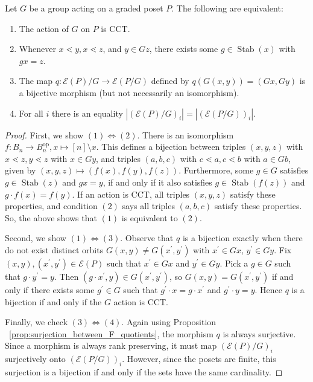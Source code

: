 \documentclass[smallextended]{svjour3}       %
\numberwithin{equation}{section}
\renewcommand{\iff}{\Leftrightarrow}
\newcommand\Stab{\operatorname{Stab}}
\newcommand\op{\operatorname{op}}
\begin{document}
\begin{lemma}
\label{lem:cover_transitive_equivalence}
Let $G$ be a group acting on a graded poset $P$. The following are equivalent:
\begin{enumerate}
  \item The action of $G$ on $P$ is CCT.
  \item Whenever $x \lessdot y,x \lessdot z$, and $y \in Gz$, there exists some $g \in \Stab(x)$ with $gx = z$.
  \item The map $q\colon \mathcal E(P)/G\rightarrow \mathcal E(P/G)$ defined by $q(G(x, y)) = (Gx,Gy)$ is a bijective morphism (but not necessarily an isomorphism).
  \item For all $i$ there is an equality $|(\mathcal E(P)/G)_i|=| (\mathcal E(P/G))_i|$.
\end{enumerate}
\end{lemma}
\begin{proof}
First, we show $(1) \iff (2)$. There is an isomorphism $f\colon B_n \rightarrow B_n^{\op},x \mapsto [n]\setminus x$. This defines a bijection between triples $(x,y,z)$ with $x \lessdot z,y \lessdot z$ with $x \in Gy$, and triples $(a,b,c)$ with $c \lessdot a, c \lessdot b$ with $a \in Gb$, given by $(x,y,z)\mapsto (f(x),f(y),f(z))$. Furthermore, some $g \in G$ satisfies $g \in \Stab(z)$ and $gx = y$, if and only if it also satisfies $g \in \Stab(f(z))$ and $g\cdot f(x) = f(y)$. If an action is CCT, all triples $(x,y,z)$ satisfy these properties, and condition $(2)$ says all triples $(a,b,c)$ satisfy these properties. So, the above shows that $(1)$ is equivalent to $(2)$.

Second, we show $(1) \iff (3)$. Observe that $q$ is a bijection exactly when there do not exist distinct orbits $G(x, y) \ne G(x^\prime, y^\prime)$ with $x^\prime\in Gx$, $y^\prime\in Gy$.  Fix $(x, y), (x^\prime, y^\prime)\in \mathcal E(P)$ such that $x^\prime\in Gx$ and $y^\prime\in Gy$.  Pick a $g\in G$ such that $g\cdot y^\prime = y$.  Then $(g\cdot x^\prime, y)\in G(x^\prime, y^\prime)$, so $G(x, y) = G(x^\prime, y^\prime)$ if and only if there exists some $g^\prime\in G$ such that $g^\prime\cdot x = g\cdot x^\prime$ and $g^\prime\cdot y = y$. Hence $q$ is a bijection if and only if the $G$ action is CCT.

Finally, we check $(3)\iff (4)$. Again using Proposition ~\ref{prop:surjection_between_F_quotients}, the morphism $q$ is always surjective. Since a morphism is always rank preserving, it must map $(\mathcal E(P)/G)_i$ surjectively onto $(\mathcal E(P/G))_i$. However, since the posets are finite, this surjection is a bijection if and only if the sets have the same cardinality.
\end{proof}
\end{document}
